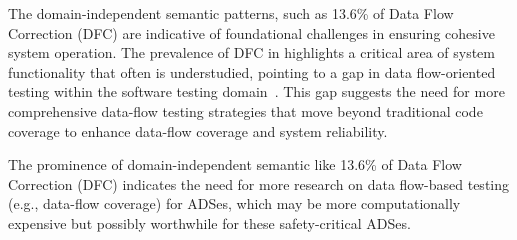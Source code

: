 The domain-independent semantic patterns, such as 13.6\% of Data Flow Correction (DFC) 
are indicative of foundational challenges in ensuring cohesive system operation.
The prevalence of DFC in \bfps highlights a critical area of system functionality that often is understudied, pointing to a gap in data flow-oriented testing within the software testing domain~\cite{SuWMPHCS17,Weyuker90}. This gap suggests the need for more comprehensive data-flow testing strategies that move beyond traditional code coverage to enhance data-flow coverage and system reliability.

\vspace{-1ex}
\begin{finding}
\label{finding:rq1_dfc}
    The prominence of domain-independent semantic \bfps like 13.6\% of Data Flow Correction (DFC) indicates the need for more research on data flow-based testing  (e.g., data-flow coverage) for ADSes, which may be more computationally expensive but possibly worthwhile for these safety-critical ADSes.
\end{finding}
\vspace{-1ex}



